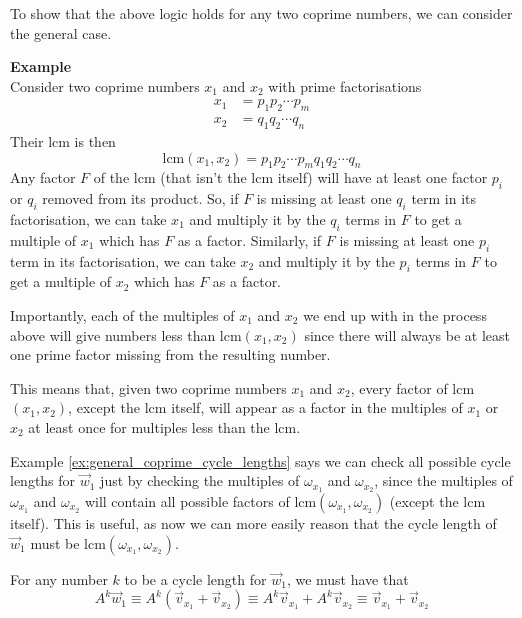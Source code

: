 \documentclass[a4paper, 12pt, reqno]{amsart}
\newcounter{mathexample}[section]
\newenvironment{mathexample}
{
	\refstepcounter{mathexample} %
	\textbf{Example \themathexample} 
	\\
}
{
	\vspace{1cm}
}
\begin{document}
	To show that the above logic holds for any two coprime numbers, we can consider the general case.
	
	\begin{mathexample}
		\label{ex:general_coprime_cycle_lengths}
		Consider two coprime numbers $x_1$ and $x_2$ with prime factorisations
		\begin{align*}
			x_1 &= {p_1}{p_2} \cdots {p_m} \\
			x_2 &= {q_1}{q_2} \cdots {q_n}
		\end{align*}
		Their lcm is then
		\[
			\text{lcm}(x_1, x_2) = {p_1}{p_2} \cdots {p_m}{q_1}{q_2} \cdots {q_n}
		\]
		Any factor $F$ of the lcm (that isn't the lcm itself) will have at least one factor 
		$p_i$ or $q_i$ removed from its product. So, if $F$ is missing at least one $q_i$ term
		in its factorisation, we can take $x_1$ and multiply it by the $q_i$ terms in $F$ to get 
		a multiple of $x_1$ which has $F$ as a factor. Similarly, if $F$ is missing at least one 
		$p_i$ term in its factorisation, we can take $x_2$ and multiply it by the $p_i$ terms in
		$F$ to get a multiple of $x_2$ which has $F$ as a factor.
		
		Importantly, each of the multiples of $x_1$ and $x_2$ we end up with in the process above
		will give numbers less than lcm$(x_1, x_2)$ since there will always be at least one
		prime factor missing from the resulting number.
		
		This means that, given two coprime numbers $x_1$ and $x_2$, every factor of lcm$(x_1, x_2)$,
		except the lcm itself, will appear as a factor in the multiples of $x_1$ or $x_2$ at least
		once for multiples less than the lcm.
	\end{mathexample}
	
	Example \ref{ex:general_coprime_cycle_lengths} says we can check all possible cycle
	lengths for $\vec{w}_{1}$ just by checking the multiples of $\omega_{x_{1}}$ and 
	$\omega_{x_{2}}$, since the multiples of $\omega_{x_1}$ and $\omega_{x_2}$ will contain
	all possible factors of lcm$(\omega_{x_1}, \omega_{x_2})$ (except the lcm itself). 
	This is useful, as now we can more easily reason that the cycle length of $\vec{w}_{1}$ 
	must be lcm$(\omega_{x_{1}}, \omega_{x_{2}})$.
	
	For any number $k$ to be a cycle length for $\vec{w}_{1}$, we must have that
	\[
		A^{k}\vec{w}_{1}                          \equiv 
		A^{k}(\vec{v}_{x_{1}} + \vec{v}_{x_{2}})  \equiv 
		A^{k}\vec{v}_{x_{1}} + A^k\vec{v}_{x_{2}} \equiv
		\vec{v}_{x_{1}} + \vec{v}_{x_{2}}
	\]
	
\end{document}
